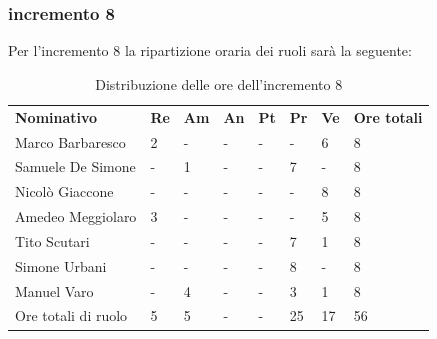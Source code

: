 \subsubsection{incremento 8}
Per l'incremento 8 la ripartizione oraria dei ruoli sarà la seguente:
\begin{center}
    \begin{table}[ht!]
        \centering
        \caption{Distribuzione delle ore dell'incremento 8}
        \vspace{5px}
        \renewcommand{\arraystretch}{1.8}
        \begin{tabular}{p{100px} p{20px} p{20px} p{20px} p{20px} p{20px} p{20px} p{50px} }
            \rowcolor{logo!70} \textbf{Nominativo} & \textbf{Re} & \textbf{Am} & \textbf{An} & \textbf{Pt} & \textbf{Pr} & \textbf{Ve} & \textbf{Ore totali} \\
            Marco Barbaresco                       & 2           & -           & -           & -           & -           & 6           & 8                   \\
            Samuele De Simone                      & -           & 1           & -           & -           & 7           & -           & 8                   \\
            Nicolò Giaccone                        & -           & -           & -           & -           & -           & 8           & 8                   \\
            Amedeo Meggiolaro                      & 3           & -           & -           & -           & -           & 5           & 8                   \\
            Tito Scutari                           & -           & -           & -           & -           & 7           & 1           & 8                   \\
            Simone Urbani                          & -           & -           & -           & -           & 8           & -           & 8                   \\
            Manuel Varo                            & -           & 4           & -           & -           & 3           & 1           & 8                   \\
            Ore totali di ruolo                    & 5           & 5           & -           & -           & 25          & 17          & 56                  \\
        \end{tabular}
    \end{table}
\end{center}
